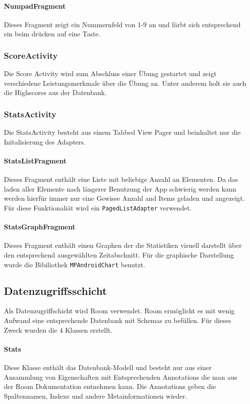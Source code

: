 \paragraph{NumpadFragment}
Dieses Fragment zeigt ein Nummernfeld von 1-9 an und färbt sich entsprechend
ein beim drücken auf eine Taste.

\subsubsection{ScoreActivity}
Die Score Activity wird zum Abschluss einer Übung gestartet und zeigt
verschiedene Leistungsmerkmale über die Übung an. Unter anderem holt sie auch
die Highscores aus der Datenbank.

\subsubsection{StatsActivity}
Die StatsActivity besteht aus einem Tabbed View Pager und beinhaltet nur die
Initalisierung des Adapters.

\paragraph{StatsListFragment}
Dieses Fragment enthält eine Liste mit beliebige Anzahl an Elementen. Da das
laden aller Elemente nach längerer Benutzung der App schwierig werden kann
werden hierfür immer nur eine Gewisse Anzahl and Items geladen und angezeigt.
Für diese Funktionaliät wird ein \texttt{PagedListAdapter} verwendet.

\paragraph{StatsGraphFragment}
Dieses Fragment enthält einen Graphen der die Statistiken visuell darstellt
über den entsprechend ausgewählten Zeitabschnitt. Für die graphische
Darstellung wurde die Bibiliothek \texttt{MPAndroidChart} benutzt.

\subsection{Datenzugriffsschicht}
Als Datenzugriffschicht wird Room verwendet. Room ermöglicht es mit wenig
Aufwand eine entsprechende Datenbank mit Schemas zu befüllen. Für dieses
Zweck wurden die 4 Klassen erstellt.

\paragraph{Stats}
Diese Klasse enthält das Datenbank-Modell und besteht nur aus einer
Ansammlung von Eigenschaften mit Entsprechenden Annotations die man aus
der Room Dokumentation entnehmen kann. Die Annotations geben die
Spaltennamen, Indexe und andere Metainformationen wieder.

